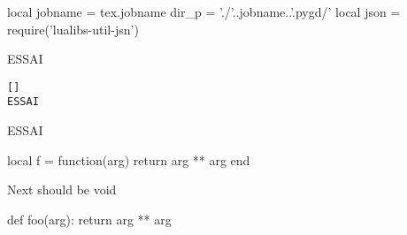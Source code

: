 \def\FVE@CDRBlock {
  \FV@VerbatimEnd
  \bool_if:NT \l_CDR_pygments_bool {
    \cs_set:Npn \CDR@StyleUseTag {
      \CDR@StyleUse { \CDR_tag_get:c { style } }
      \cs_set:Npn \CDR@StyleUseTag \prg_do_nothing:
    }
    \CDR@StyleIfExist { \CDR_tag_get:c { style } } { \typeout{ TRUE: \CDR_tag_get:c { style } } } { \typeout { FALSE: \CDR_tag_get:c { style } } }
    \CDR_tag_get:cN {lang} \l_CDR_tl
    \lua_now:n { CDR:hilight_set_var('lang') }
    \CDR_tag_get:cN {cache} \l_CDR_tl
    \lua_now:n { CDR:hilight_set_var('cache') }
    \CDR_tag_get:cN {debug} \l_CDR_tl
    \lua_now:n { CDR:hilight_set_var('debug') }
    \CDR_tag_get:cN {style} \l_CDR_tl
    \lua_now:n { CDR:hilight_set_var('style') }
    \CDR@StyleIfExist { \l_CDR_tl } {
      \lua_now:n { CDR:hilight_set('ignore_style', 'true') }
    } { }
    \CDR_code_format:
    \FV@UseKeyValues
    \frenchspacing
    \FV@DefineWhiteSpace
    \FancyVerbDefineActive
    \FancyVerbFormatCom
    \CDR_tag_get:c { format }
    \lua_now:n { CDR:hilight_block() }
  }
  \use:c { end \CDR_block_engine:V \l_CDR_engine_tl }
  \group_end:
  \@esphack
}
\ExplSyntaxOff
\makeatother
{}
\begin{luacode}
local jobname = tex.jobname
dir_p = './'..jobname..'.pygd/'
local json  = require('lualibs-util-jsn')


\end{luacode}
%
%
ESSAI
\begin{Verbatim}
[]
ESSAI
\end{Verbatim}
\begin{MyVerbatim}[fontsize=\Large]
ESSAI
\end{MyVerbatim}
\begin{CDRBlock} [
  tags=,
  fontfamily=menlo,
  fontsize=\Large,
  pygments=false,
  lang=lua,
  numbers=left,
  frame=lines,
  format=\color{green},
]
local f = function(arg)
  return arg ** arg
end
\end{CDRBlock}
Next should be void
\begin{CDRBlock} [
  tags=,
  fontfamily=menlo,
  fontsize=\large,
  pygments=true,
  lang=python,
  numbers=left,
  frame=lines,
]
def foo(arg):
  return arg ** arg
\end{CDRBlock}

\egroup
{}
